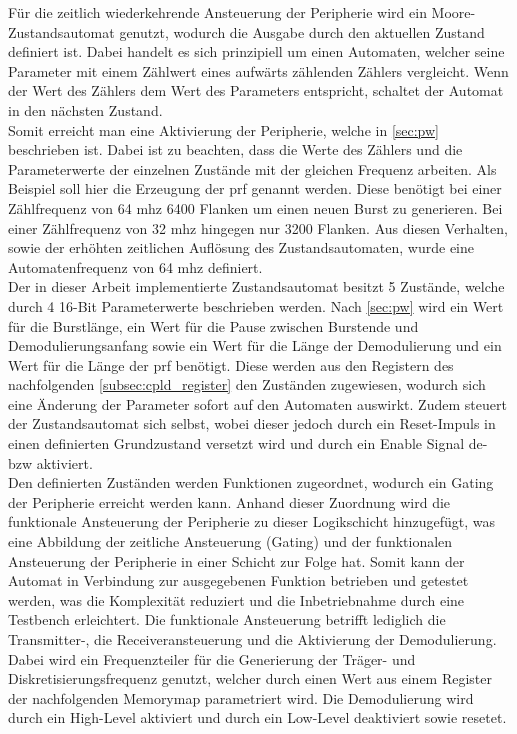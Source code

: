 Für die zeitlich wiederkehrende Ansteuerung der Peripherie wird ein Moore-Zustandsautomat genutzt, wodurch die Ausgabe durch den aktuellen Zustand definiert ist. Dabei handelt es sich prinzipiell um einen Automaten, welcher seine Parameter mit einem Zählwert eines aufwärts zählenden Zählers vergleicht. Wenn der Wert des Zählers dem Wert des Parameters entspricht, schaltet der Automat in den nächsten Zustand.\\
Somit erreicht man eine Aktivierung der Peripherie, welche in \autoref{sec:pw} beschrieben ist. Dabei ist zu beachten, dass die Werte des Zählers und die Parameterwerte der einzelnen Zustände mit der gleichen Frequenz arbeiten.
Als Beispiel soll hier die Erzeugung der \ac{prf} genannt werden. Diese benötigt bei einer Zählfrequenz von 64 \ac{mhz} 6400 Flanken um einen neuen Burst zu generieren. Bei einer Zählfrequenz von 32 \ac{mhz} hingegen nur 3200 Flanken. Aus diesen Verhalten, sowie der erhöhten zeitlichen Auflösung des Zustandsautomaten, wurde eine Automatenfrequenz von 64 \ac{mhz} definiert.\\
Der in dieser Arbeit implementierte Zustandsautomat besitzt 5 Zustände, welche durch 4 16-Bit Parameterwerte beschrieben werden. Nach \autoref{sec:pw} wird ein Wert für die Burstlänge, ein Wert für die Pause zwischen Burstende und Demodulierungsanfang sowie ein Wert für die Länge der Demodulierung und ein Wert für die Länge der \ac{prf} benötigt. Diese werden aus den Registern des nachfolgenden \autoref{subsec:cpld_register} den Zuständen zugewiesen, wodurch sich eine Änderung der Parameter sofort auf den Automaten auswirkt. Zudem steuert der Zustandsautomat sich selbst, wobei dieser jedoch durch ein Reset-Impuls in einen definierten Grundzustand versetzt wird und durch ein Enable Signal de- \ac{bzw} aktiviert.\\
Den definierten Zuständen werden Funktionen zugeordnet, wodurch ein Gating der Peripherie erreicht werden kann. Anhand dieser Zuordnung wird die funktionale Ansteuerung der Peripherie zu dieser Logikschicht hinzugefügt, was eine Abbildung der zeitliche Ansteuerung (Gating) und der funktionalen Ansteuerung der Peripherie in einer Schicht zur Folge hat. Somit kann der Automat in Verbindung zur ausgegebenen Funktion betrieben und getestet werden, was die Komplexität reduziert und die Inbetriebnahme durch eine Testbench erleichtert.
Die funktionale Ansteuerung betrifft lediglich die Transmitter-, die Receiveransteuerung und die Aktivierung der Demodulierung. Dabei wird ein Frequenzteiler für die Generierung der Träger- und Diskretisierungsfrequenz genutzt, welcher durch einen Wert aus einem Register der nachfolgenden Memorymap parametriert wird. Die Demodulierung wird durch ein High-Level aktiviert und durch ein Low-Level deaktiviert sowie resetet.
